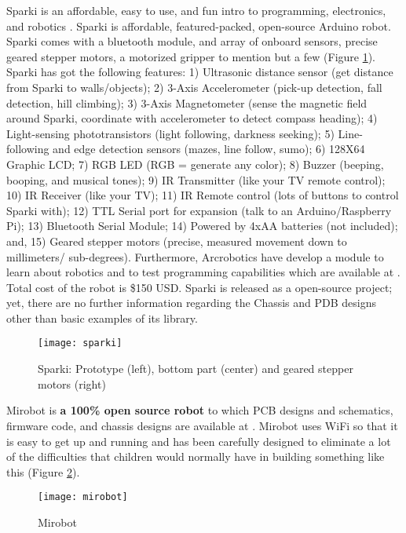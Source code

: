 Sparki is an affordable, easy to use, and fun intro to programming, electronics, and 
robotics \cite{sparki}. Sparki is affordable, featured-packed, open-source Arduino robot. 
Sparki comes with a bluetooth module, and array of onboard sensors, precise geared 
stepper motors, a motorized gripper to mention but a few (Figure \ref{fig:sparki}).
Sparki has got the following features: 
1) Ultrasonic distance sensor (get distance from Sparki to walls/objects);
2) 3-Axis Accelerometer (pick-up detection, fall detection, hill climbing);
3) 3-Axis Magnetometer (sense the magnetic field around Sparki, coordinate with 
accelerometer to detect compass heading);
4) Light-sensing phototransistors (light following, darkness seeking);
5) Line-following and edge detection sensors (mazes, line follow, sumo);
6) 128X64 Graphic LCD;
7) RGB LED (RGB = generate any color);
8) Buzzer (beeping, booping, and musical tones);
9) IR Transmitter (like your TV remote control);
10) IR Receiver (like your TV);
11) IR Remote control (lots of buttons to control Sparki with);
12) TTL Serial port for expansion (talk to an Arduino/Raspberry Pi);
13) Bluetooth Serial Module;
14) Powered by 4xAA batteries (not included); and,
15) Geared stepper motors (precise, measured movement down to millimeters/ sub-degrees).
Furthermore, Arcrobotics have develop a module to learn about robotics and to test 
programming capabilities which are available at \cite{sparkisoftware}. Total cost of the 
robot is \$150 USD. Sparki is released as a open-source project; yet, there are no 
further information regarding the Chassis and PDB designs other than basic examples 
of its library.
\begin{figure}[htbp!] 
\centering    
\texttt{[image: sparki]}
\caption[PA]{Sparki: Prototype (left), bottom part (center) and geared stepper motors 
(right)}
\label{fig:sparki}
\end{figure}
 
 
Mirobot is \textbf{a 100\% open source robot }to which PCB designs and schematics, 
firmware code, and chassis designs are available at \cite{mirobot}. Mirobot uses WiFi 
so that it is easy to get up and running and has been carefully designed to eliminate 
a lot of the difficulties that children  would normally have in building something like 
this (Figure \ref{fig:mirobot}). 
\begin{figure}[htbp!] 
\centering    
\texttt{[image: mirobot]}
\caption[PA]{Mirobot}
\label{fig:mirobot}
\end{figure}
 
